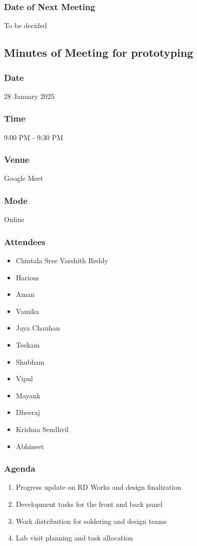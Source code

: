 \documentclass[12pt,a4paper]{article}
\begin{document}
\subsubsection*{Date of Next Meeting}
To be decided

\subsection*{Minutes of Meeting for prototyping}

\subsubsection*{Date}
28 January 2025

\subsubsection*{Time}
9:00 PM - 9:30 PM

\subsubsection*{Venue}
Google Meet

\subsubsection*{Mode}
Online

\subsubsection*{Attendees}
\begin{itemize}
    \item Chintala Sree Varshith Reddy
    \item Hariom
    \item Aman
    \item Vamika
    \item Jaya Chauhan
    \item Teekam
    \item Shubham
    \item Vipul
    \item Mayank
    \item Dheeraj
    \item Krishna Sendhvil
    \item Abhineet
\end{itemize}

\subsubsection*{Agenda}
\begin{enumerate}
    \item Progress update on RD Works and design finalization
    \item Development tasks for the front and back panel
    \item Work distribution for soldering and design teams
    \item Lab visit planning and task allocation
\end{enumerate}
\end{document}
